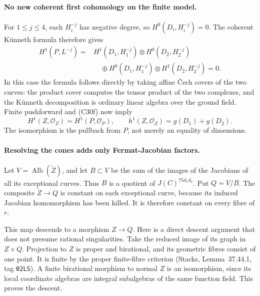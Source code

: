 \paragraph{No new coherent first cohomology on the finite model.}
For $1\leq j\leq4$, each $H_i^{-j}$ has negative
degree, so $H^0(D_i,H_i^{-j})=0$.  The coherent
K\"unneth formula therefore gives
\[
 \begin{aligned}
 H^1(P,L^{-j})={}&
 H^1(D_1,H_1^{-j})\otimes H^0(D_2,H_2^{-j})\\
 &\quad\oplus
 H^0(D_1,H_1^{-j})\otimes H^1(D_2,H_2^{-j})=0.
 \end{aligned}
                                                        \tag{C30j}
\]
In this case the formula follows directly by taking
affine \v Cech covers of the two curves: the product
cover computes the tensor product of the two
complexes, and the K\"unneth decomposition is ordinary
linear algebra over the ground field.
Finite pushforward and (C30f) now imply
\[
 H^1(Z,\mathcal O_Z)=H^1(P,\mathcal O_P),\qquad
 h^1(Z,\mathcal O_Z)=g(D_1)+g(D_2).
                                                        \tag{C30k}
\]
The isomorphism is the pullback from $P$, not merely
an equality of dimensions.

\paragraph{Resolving the cones adds only Fermat-Jacobian factors.}
Let $V=\operatorname{Alb}(\widetilde Z)$, and let
$B\subset V$ be the sum of the images of the
Jacobians of all its exceptional curves.  Thus $B$
is a quotient of $J(C)^{75d_1d_2}$.  Put $Q=V/B$.
The composite $\widetilde Z\to Q$ is constant on
each exceptional curve, because its induced Jacobian
homomorphism has been killed.  It is therefore constant
on every fibre of $r$.

This map descends to a morphism $Z\to Q$.  Here is
a direct descent argument that does not presume
rational singularities.  Take the reduced image of
its graph in $Z\times Q$.  Projection to $Z$ is
proper and birational, and its geometric fibres
consist of one point.  It is finite by the proper
finite-fibre criterion (Stacks, Lemma~37.44.1,
tag \texttt{02LS}).  A finite birational morphism
to normal $Z$ is an isomorphism, since its local
coordinate algebras are integral subalgebras of
the same function field.  This proves the descent.

